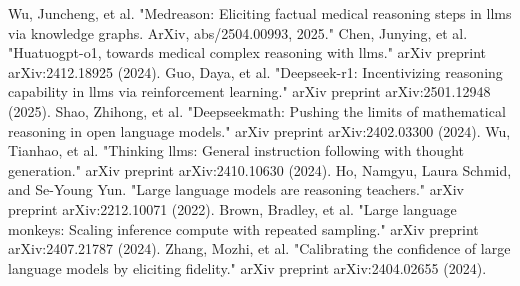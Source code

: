 \documentclass[conference]{IEEEtran}
\begin{document}
\begin{thebibliography}{00}
             Wu, Juncheng, et al. "Medreason: Eliciting factual medical reasoning steps in llms via knowledge graphs. ArXiv, abs/2504.00993, 2025."
             Chen, Junying, et al. "Huatuogpt-o1, towards medical complex reasoning with llms." arXiv preprint arXiv:2412.18925 (2024).
             Guo, Daya, et al. "Deepseek-r1: Incentivizing reasoning capability in llms via reinforcement learning." arXiv preprint arXiv:2501.12948 (2025).
             Shao, Zhihong, et al. "Deepseekmath: Pushing the limits of mathematical reasoning in open language models." arXiv preprint arXiv:2402.03300 (2024).
             Wu, Tianhao, et al. "Thinking llms: General instruction following with thought generation." arXiv preprint arXiv:2410.10630 (2024).
             Ho, Namgyu, Laura Schmid, and Se-Young Yun. "Large language models are reasoning teachers." arXiv preprint arXiv:2212.10071 (2022).
             Brown, Bradley, et al. "Large language monkeys: Scaling inference compute with repeated sampling." arXiv preprint arXiv:2407.21787 (2024).
             Zhang, Mozhi, et al. "Calibrating the confidence of large language models by eliciting fidelity." arXiv preprint arXiv:2404.02655 (2024).
            
         
	\end{thebibliography}
	
	
\end{document}
